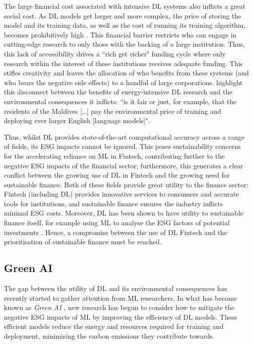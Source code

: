 \documentclass[a4paper, 11pt]{report}
\begin{document}
   The large financial cost associated with intensive DL systems also inflicts a great social cost. As DL models get larger and more complex, the price of storing the model and its training data, as well as the cost of running its training algorithm, becomes prohibitively high \citep{schwartz-2019}. This financial barrier restricts who can engage in cutting-edge research to only those with the backing of a large institution. Thus, this lack of accessibility drives a ``rich get richer" funding cycle \citep{strubell-2019} where only research within the interest of these institutions receives adequate funding. This stifles creativity and leaves the allocation of who benefits from these systems (and who bears the negative side effects) to a handful of large corporations. \citet{bender-2021} highlight this disconnect between the benefits of energy-intensive DL research and the environmental consequences it inflicts: ``is it fair or just, for example, that the residents of the Maldives [\ldots] pay the environmental price of training and deploying ever larger English [language models]".

    Thus, whilst DL provides state-of-the-art computational accuracy across a range of fields, its ESG impacts cannot be ignored. This poses sustainability concerns for the accelerating reliance on ML in Fintech, contributing further to the negative ESG impacts of the financial sector; furthermore, this generates a clear conflict between the growing use of DL in Fintech and the growing need for sustainable finance. Both of these fields provide great utility to the finance sector: Fintech (including DL) provides innovative services to consumers and accurate tools for institutions, and sustainable finance ensures the industry inflicts minimal ESG costs. Moreover, DL has been shown to have utility to sustainable finance itself, for example using ML to analyse the ESG factors of potential investments \citep{mehra-2022}. Hence, a compromise between the use of DL Fintech and the prioritisation of sustainable finance must be reached. 


    \subsection{Green AI}

    The gap between the utility of DL and its environmental consequences has recently started to gather attention from ML researchers. In what has become known as \emph{Green AI} \citep{schwartz-2019}, new research has begun to consider how to mitigate the negative ESG impacts of ML by improving the efficiency of DL models. These efficient models reduce the energy and resources required for training and deployment, minimising the carbon emissions they contribute towards. 
\end{document}
